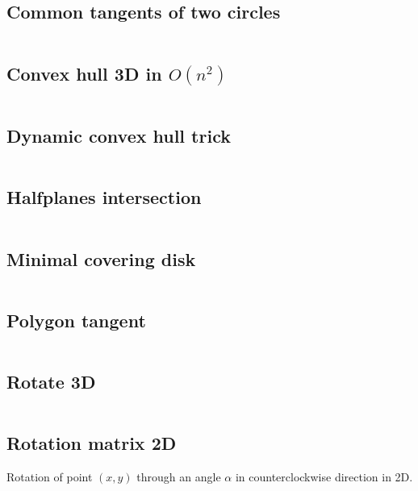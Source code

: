 \documentclass{article}
\begin{document}
\subsection{Common tangents of two circles}
\inputminted[mathescape, breaklines, breakafter=(, tabsize=2, frame=lines, showtabs, tab=|\ , tabcolor=lightgray]{c++}{./geometry/common-tangents/common-tangents.cpp}
\subsection{Convex hull 3D in $O(n ^ 2)$}
\inputminted[mathescape, breaklines, breakafter=(, tabsize=2, frame=lines, showtabs, tab=|\ , tabcolor=lightgray]{c++}{./geometry/convex-hull-3d/convex-hull-3d.cpp}
\subsection{Dynamic convex hull trick}
\inputminted[mathescape, breaklines, breakafter=(, tabsize=2, frame=lines, showtabs, tab=|\ , tabcolor=lightgray]{c++}{./geometry/convex-hull-trick/convex-hull-trick.cpp}
\subsection{Halfplanes intersection}
\inputminted[mathescape, breaklines, breakafter=(, tabsize=2, frame=lines, showtabs, tab=|\ , tabcolor=lightgray]{c++}{./geometry/halfplanes-intersection/halfplanes-intersection.cpp}
\subsection{Minimal covering disk}
\inputminted[mathescape, breaklines, breakafter=(, tabsize=2, frame=lines, showtabs, tab=|\ , tabcolor=lightgray]{c++}{./geometry/min-disk/min-disk.cpp}
\subsection{Polygon tangent}
\inputminted[mathescape, breaklines, breakafter=(, tabsize=2, frame=lines, showtabs, tab=|\ , tabcolor=lightgray]{c++}{./geometry/polygon-tangent/polygon-tangent.cpp}
\subsection{Rotate 3D}
\inputminted[mathescape, breaklines, breakafter=(, tabsize=2, frame=lines, showtabs, tab=|\ , tabcolor=lightgray]{c++}{./geometry/rotate-3d/rotate-3d.cpp}
\subsection{Rotation matrix 2D}
Rotation of point $(x, y)$ through an angle $\alpha$ in counterclockwise direction in 2D.
\end{document}

